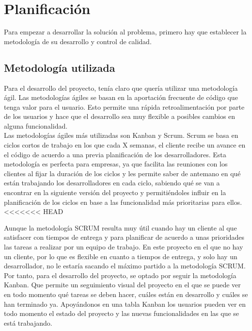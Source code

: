 \chapter{Planificación}
Para empezar a desarrollar la solución al problema, primero hay que establecer la metodología de su desarrollo y control de calidad.

\section{Metodología utilizada}
Para el desarrollo del proyecto, tenía claro que quería utilizar una metodología ágil. Las metodologías ágiles se basan en la aportación frecuente de código que tenga valor para el usuario. Esto permite una rápida retroalimentación por parte de los usuarios y hace que el desarrollo sea muy flexible a posibles cambios en alguna funcionalidad.\\

Las metodologías ágiles más utilizadas son Kanban y Scrum. Scrum se basa en ciclos cortos de trabajo en los que cada X semanas, el cliente recibe un avance en el código de acuerdo a una previa planificación de los desarrolladores. Esta metodología es perfecta para empresas, ya que facilita las reuniones con los clientes al fijar la duración de los ciclos y les permite saber de antemano en qué están trabajando los desarrolladores en cada ciclo, sabiendo qué se van a encontrar en la siguiente versión del proyecto y permitiéndoles influir en la planificación de los ciclos en base a las funcionalidad más prioritarias para ellos. \\
<<<<<<< HEAD

Aunque la metodología SCRUM resulta muy útil cuando hay un cliente al que satisfacer con tiempos de entrega y para planificar de acuerdo a unas prioridades las tareas a realizar por un equipo de trabajo. En este proyecto en el que no hay un cliente, por lo que es flexible en cuanto a tiempos de entrega, y solo hay un desarrollador, no le estaría sacando el máximo partido a la metodología SCRUM.\\

Por tanto, para el desarrollo del proyecto, se optado por seguir la metodología Kanban. Que permite un seguimiento visual del proyecto en el que se puede ver en todo momento qué tareas se deben hacer, cuáles están en desarrollo y cuáles se han terminado ya. Apoyándonos en una tabla Kanban los usuarios pueden ver en todo momento el estado del proyecto y las nuevas funcionalidades en las que se está trabajando. \\

